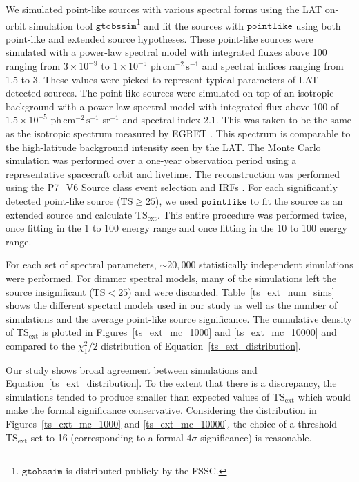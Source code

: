 \documentclass[12pt,preprint]{aastex}
\newcommand{\mev}{\text{MeV}\xspace}
\newcommand{\gev}{\text{GeV}\xspace}
\newcommand{\phflux}{\ensuremath{\text{ph}\,\text{cm}^{-2}\,\text{s}^{-1}}\xspace}
\newcommand{\tsext}{{\ensuremath{\text{TS}_{\text{ext}}}}\xspace}
\newcommand{\ts}{\text{TS}\xspace}
\newcommand{\pointlike}{\ensuremath{\mathtt{pointlike}}\xspace}
\newcommand{\gtobssim}{\ensuremath{\mathtt{gtobssim}}\xspace}
\begin{document}
We simulated point-like sources with various spectral forms using
the LAT on-orbit simulation tool
\gtobssim\footnote{\gtobssim is distributed publicly by the FSSC.} and fit the sources
with \pointlike using both point-like
and extended source hypotheses.  These point-like sources were simulated with a power-law
spectral model with integrated fluxes above 100 \mev ranging from $3\times10^{-9}$ 
to $1\times10^{-5}$ \phflux and spectral
indices ranging from 1.5 to 3.  These values
were picked to represent typical parameters of LAT-detected
sources. The point-like sources were simulated on top of an isotropic
background with a power-law spectral model with
integrated flux above 100 \mev of $1.5\times10^{-5}$ \phflux sr$^{-1}$
and spectral index 2.1.
This was
taken to be the same as the isotropic spectrum measured by EGRET
\citep{sreekumar_isotropic}.  This spectrum is comparable
to the high-latitude background intensity seen by the LAT.
The Monte Carlo simulation was performed
over a one-year observation period using a representative 
spacecraft orbit and livetime.
The reconstruction was performed
using the P7\_V6 Source class event selection and IRFs \citep{lat_on_orbit_psf}. For each 
significantly detected point-like source ($\ts\ge25$), we used \pointlike
to fit the source as an extended source and calculate \tsext.
This entire procedure was performed twice, once fitting in the 1 \gev
to 100 \gev energy range and once fitting in the 10 \gev to 100 \gev
energy range.

For each set of spectral parameters, $\sim20,000$ statistically independent
simulations were performed. For dimmer spectral models, many of the
simulations left the source insignificant ($\ts<25$)
and were discarded.  Table~\ref{ts_ext_num_sims}
shows the different spectral models used in our study as well as the
number of simulations and the average point-like source
significance.  The cumulative density of \tsext is plotted in
Figures~\ref{ts_ext_mc_1000} and \ref{ts_ext_mc_10000} 
and compared to the $\chi^2_1/2$ distribution of
Equation~\ref{ts_ext_distribution}.

Our study shows broad agreement between simulations and
Equation~\ref{ts_ext_distribution}. To the extent that there is
a discrepancy, the simulations tended to produce smaller than expected
values of \tsext which would make the formal significance conservative.
Considering the distribution in Figures~\ref{ts_ext_mc_1000} and
\ref{ts_ext_mc_10000}, the choice of a threshold \tsext set to 16
(corresponding to a formal $4\sigma$ significance) is reasonable.
\end{document}
